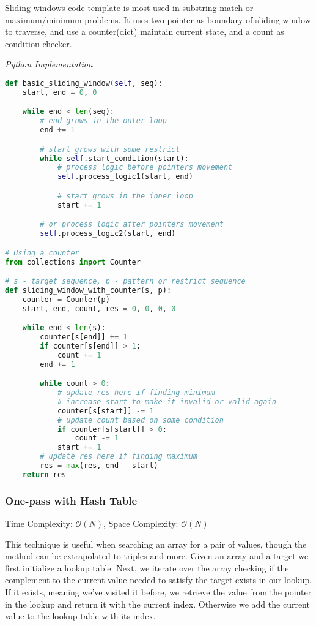 \documentclass{article}
\newcommand{\bigO}{\ensuremath{\mathcal{O}}}
\begin{document}
    Sliding windows code template is most used in substring match or maximum/minimum problems. It uses two-pointer as boundary of sliding window to traverse, and use a counter(dict) maintain current state, and a count as condition checker.

\vspace{8pt} \emph{Python Implementation}
\begin{lstlisting}[language=Python]
def basic_sliding_window(self, seq):
    start, end = 0, 0

    while end < len(seq):
        # end grows in the outer loop
        end += 1

        # start grows with some restrict
        while self.start_condition(start):
            # process logic before pointers movement
            self.process_logic1(start, end)

            # start grows in the inner loop
            start += 1

        # or process logic after pointers movement
        self.process_logic2(start, end)

# Using a counter
from collections import Counter

# s - target sequence, p - pattern or restrict sequence
def sliding_window_with_counter(s, p):
    counter = Counter(p)
    start, end, count, res = 0, 0, 0, 0

    while end < len(s):
        counter[s[end]] += 1
        if counter[s[end]] > 1:
            count += 1
        end += 1

        while count > 0:
            # update res here if finding minimum
            # increase start to make it invalid or valid again
            counter[s[start]] -= 1
            # update count based on some condition
            if counter[s[start]] > 0:
                count -= 1
            start += 1
        # update res here if finding maximum
        res = max(res, end - start)
    return res
\end{lstlisting}
  
    \subsubsection{One-pass with Hash Table}
    Time Complexity: $\bigO(N)$, Space Complexity: $\bigO(N)$
    
    This technique is useful when searching an array for a pair of values, though the method can be extrapolated to triples and more. Given an array and a target we first initialize a lookup table. Next, we iterate over the array checking if the complement to the current value needed to satisfy the target exists in our lookup. If it exists, meaning we've visited it before, we retrieve the value from the pointer in the lookup and return it with the current index. Otherwise we add the current value to the lookup table with its index.
\end{document}
